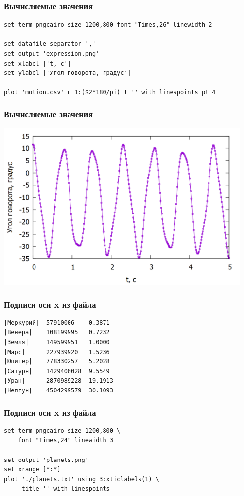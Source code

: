 \documentclass[12pt, compress]{beamer}
\begin{document}
\begin{frame}[c,fragile]
\frametitle{Вычисляемые значения}
\begin{lstlisting}[basicstyle={\scriptsize}]
set term pngcairo size 1200,800 font "Times,26" linewidth 2

set datafile separator ','
set output 'expression.png'
set xlabel |'t, c'|
set ylabel |'Угол поворота, градус'|

plot 'motion.csv' u 1:($2*180/pi) t '' with linespoints pt 4

\end{lstlisting}
\end{frame}

\begin{frame}[t,fragile]
\frametitle{Вычисляемые значения}
\includegraphics[width=0.95\textwidth]{./gp/expression.png}
\end{frame}


\begin{frame}[c,fragile]
\frametitle{Подписи оси x из файла}
\begin{lstlisting}
|Меркурий|  57910006    0.3871
|Венера|    108199995   0.7232
|Земля|     149599951   1.0000
|Марс|      227939920   1.5236
|Юпитер|    778330257   5.2028
|Сатурн|    1429400028  9.5549
|Уран|      2870989228  19.1913
|Нептун|    4504299579  30.1093
\end{lstlisting}
\end{frame}

\begin{frame}[c,fragile]
\frametitle{Подписи оси x из файла}
\begin{lstlisting}
set term pngcairo size 1200,800 \
    font "Times,24" linewidth 3

set output 'planets.png'
set xrange [*:*]
plot './planets.txt' using 3:xticlabels(1) \
     title '' with linespoints
\end{lstlisting}
\end{frame}
\end{document}
